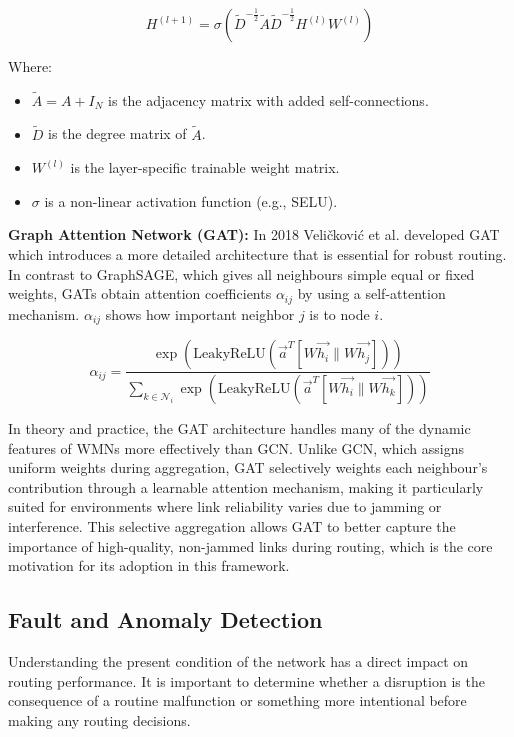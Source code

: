 \documentclass[conference]{IEEEtran}
\begin{document}
\begin{equation}
H^{(l+1)} = \sigma\left(\tilde{D}^{-\frac{1}{2}}\tilde{A}\tilde{D}^{-\frac{1}{2}}H^{(l)}W^{(l)}\right)
\end{equation}

\noindent Where:
\begin{itemize}
    \item $\tilde{A} = A + I_N$ is the adjacency matrix with added self-connections.
    \item $\tilde{D}$ is the degree matrix of $\tilde{A}$.
    \item $W^{(l)}$ is the layer-specific trainable weight matrix.
    \item $\sigma$ is a non-linear activation function (e.g., SELU).
\end{itemize}

\textbf{Graph Attention Network (GAT):} In 2018 Veli\v{c}kovi\'{c} et al. developed GAT which introduces a more detailed architecture that is essential for robust routing. In contrast to GraphSAGE, which gives all neighbours simple equal or fixed weights, GATs obtain attention coefficients $\alpha_{ij}$ by using a self-attention mechanism. $\alpha_{ij}$ shows how important neighbor $j$ is to node $i$.

\begin{equation}
\alpha_{ij} = \frac{\exp\left(\text{LeakyReLU}\left(\vec{a}^T\left[W\vec{h_i} \| W\vec{h_j}\right]\right)\right)}{\sum_{k \in \mathcal{N}_i} \exp\left(\text{LeakyReLU}\left(\vec{a}^T\left[W\vec{h_i} \| W\vec{h_k}\right]\right)\right)}
\label{eq:gat}
\end{equation}

In theory and practice, the GAT architecture handles many of the dynamic features of WMNs more effectively than GCN. Unlike GCN, which assigns uniform weights during aggregation, GAT selectively weights each neighbour's contribution through a learnable attention mechanism, making it particularly suited for environments where link reliability varies due to jamming or interference. This selective aggregation allows GAT to better capture the importance of high-quality, non-jammed links during routing, which is the core motivation for its adoption in this framework.

\subsection{Fault and Anomaly Detection}

Understanding the present condition of the network has a direct impact on routing performance. It is important to determine whether a disruption is the consequence of a routine malfunction or something more intentional before making any routing decisions.
\end{document}
